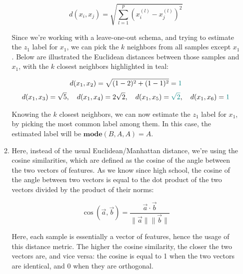 \documentclass[12pt]{article}
\begin{document}
\begin{enumerate}[leftmargin=\labelsep]
\begin{enumerate}
{                \begin{equation*}
                  d(x_i, x_j) = \sqrt{\sum_{l=1}^p (x_{i}^{(l)} - x_{j}^{(l)})^2}
                \end{equation*}

                Since we're working with a leave-one-out schema, and trying to estimate
                the $z_1$ label for $x_1$, we can pick the $k$ neighbors from all
                samples except $x_1$. Below are illustrated the Euclidean distances
                between those samples and $x_1$, with the $k$ closest neighbors highlighted
                in teal:

                \begin{align*}
                  d(x_1, x_2) = \sqrt{(1 - 2)^2 + (1 - 1)^2} = \textcolor{teal}{1}
                \end{align*}
                \begin{align*}
                  d(x_1, x_3) = \sqrt{5}  , \quad
                  d(x_1, x_4) = 2 \sqrt{2}, \quad
                  d(x_1, x_5) = \textcolor{teal}{\sqrt{2}}  , \quad
                  d(x_1, x_6) = \textcolor{teal}{1}
                \end{align*}

                Knowing the $k$ closest neighbors, we can now estimate the $z_1$ label
                for $x_1$, by picking the most common label among them. In this case,
                the estimated label will be $\mathbf{mode} (B, A, A) = A$.
                }
          \item {
                Here, instead of the usual Euclidean/Manhattan distance, we're using the
                cosine similarities, which are defined as the cosine of the angle between
                the two vectors of features. As we know since high school, the cosine of
                the angle between two vectors is equal to the dot product of the two
                vectors divided by the product of their norms:

                \begin{equation*}
                  \cos(\vec{a}, \vec{b}) = \frac{\vec{a} \cdot \vec{b}}{\|\vec{a}\| \|\vec{b}\|}
                \end{equation*}

                Here, each sample is essentially a vector of features, hence the usage
                of this distance metric. The higher the cosine similarity, the closer
                the two vectors are, and vice versa: the cosine is equal to 1 when the
                two vectors are identical, and 0 when they are orthogonal.

}
\end{enumerate}
\end{enumerate}
\end{document}
